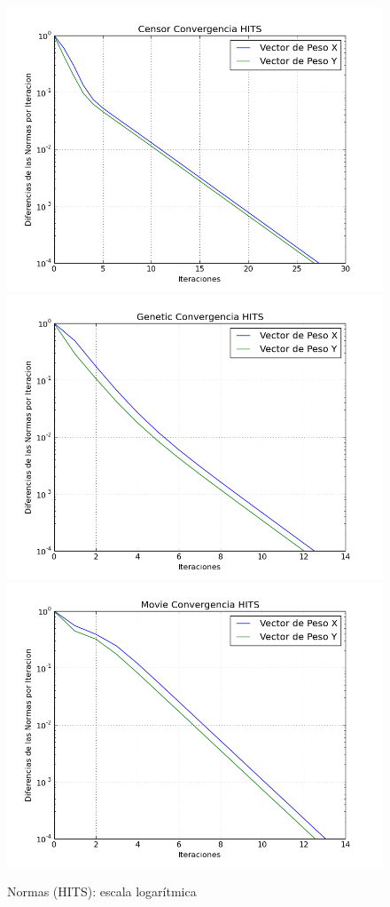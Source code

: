 \documentclass[a4paper]{article}
\begin{document}
\begin{figure}[htbp]
\centering
\includegraphics[scale=0.25]{img/Normas-HITS-Censor.png}
\includegraphics[scale=0.25]{img/Normas-HITS-Genetic.png} 
\includegraphics[scale=0.25]{img/Normas-HITS-Movie.png}

\caption{Normas (HITS): escala logarítmica}
\end{figure}
\end{document}
